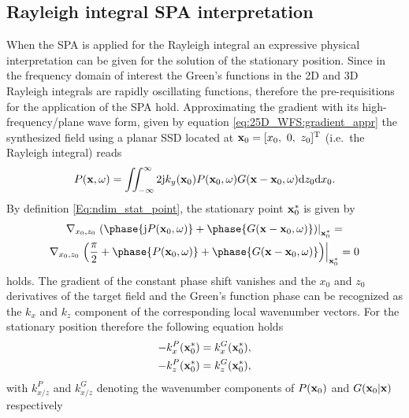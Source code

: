 \subsection{Rayleigh integral SPA interpretation}
When the SPA is applied for the Rayleigh integral an expressive physical interpretation can be given for the solution of the stationary position.
Since in the frequency domain of interest the Green's functions in the 2D and 3D Rayleigh integrals are rapidly oscillating functions, therefore the pre-requisitions for the application of the SPA hold.
Approximating the gradient with its high-frequency/plane wave form, given by equation \eqref{eq:25D_WFS:gradient_appr} 
the synthesized field using a planar SSD located at $\mathbf{x}_0 = [x_0,\ 0,\ z_0]^{\mathrm{T}}$ (i.e.\ the Rayleigh integral) reads
\begin{equation}
P(\mathbf{x},\omega) = \iint_{-\infty}^{\infty} 2 \mathrm{j} k_y(\mathbf{x}_0) P(\mathbf{x}_0,\omega) G(\mathbf{x}-\mathbf{x}_0,\omega) \mathrm{d} z_0 \mathrm{d} x_0.
\end{equation}
By definition \eqref{Eq:ndim_stat_point}, the stationary point $\mathbf{x}_0^*$ is given by
\begin{multline}
\nabla_{x_0,z_0} \left.
\left( \phase{ \ti P(\vxo,\omega)} + \phase{ G(\vx-\vxo,\omega)} \right) \right|_{\vxo^*} =
\\
\nabla_{x_0,z_0} \left.
\left( \frac{\pi}{2}+\phase{ P(\vxo,\omega)} + \phase{ G(\vx-\vxo,\omega)} \right) \right|_{\vxo^*} = 0
\end{multline}
holds.
The gradient of the constant phase shift vanishes and the $x_0$ and $z_0$ derivatives of the target field and the Green's function phase can be recognized as the $k_x$ and $k_z$ component of the corresponding local wavenumber vectors.
For the stationary position therefore the following equation holds
\begin{align}
\begin{split}
-k_{x}^P(\mathbf{x}_0^*) &= k_{x}^G(\mathbf{x}_0^*), \\
-k_{z}^P(\mathbf{x}_0^*) &= k_{z}^G(\mathbf{x}_0^*),
\end{split}
\end{align}
with $k_{x/z}^{P}$ and $k_{x/z}^{G}$ denoting the wavenumber components of $P(\mathbf{x}_0)$ and $G(\mathbf{x}_0|\mathbf{x})$ respectively
%
